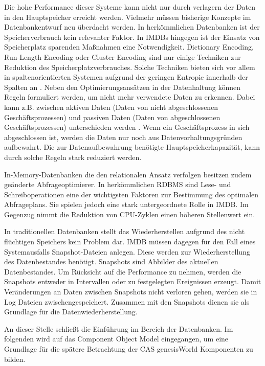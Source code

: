 Die hohe Performance dieser Systeme kann nicht nur durch verlagern der Daten in den Hauptspeicher erreicht werden. Vielmehr müssen bisherige Konzepte im Datenbankentwurf neu überdacht werden. In herkömmlichen Datenbanken ist der Speicherverbrauch kein relevanter Faktor. In IMDBs hingegen ist der Einsatz von Speicherplatz sparenden Maßnahmen eine Notwendigkeit. Dictionary Encoding, Run-Length Encoding oder Cluster Encoding sind nur einige Techniken zur Reduktion des Speicherplatzverbrauches. Solche Techniken bieten sich vor allem in spaltenorientierten Systemen aufgrund der geringen Entropie innerhalb der Spalten an \cite{Abadi:2006:ICE:1142473.1142548}. Neben den Optimierungsansätzen in der Datenhaltung können Regeln formuliert werden, um nicht mehr verwendete Daten zu erkennen. Dabei kann z.B. zwischen aktiven Daten (Daten von nicht abgeschlossenen Geschäftsprozessen) und passiven Daten (Daten von abgeschlossenen Geschäftsprozessen) unterschieden werden \cite{10.1109/ICDE.2013.6544811}. Wenn ein Geschäftsprozess in sich abgeschlossen ist, werden die Daten nur noch aus Datenvorhaltungsgründen aufbewahrt. Die zur Datenaufbewahrung benötigte Hauptspeicherkapazität, kann durch solche Regeln stark reduziert werden.
 
In-Memory-Datenbanken die den relationalen Ansatz verfolgen besitzen zudem geänderte Abfrageoptimierer. In herkömmlichen RDBMS sind Lese- und Schreiboperationen eine der wichtigsten Faktoren zur Bestimmung des optimalen Abfrageplans. Sie spielen jedoch eine stark untergeordnete Rolle in IMDB. Im Gegenzug nimmt die Reduktion von CPU-Zyklen einen höheren Stellenwert ein.

In traditionellen Datenbanken stellt das Wiederherstellen aufgrund des nicht flüchtigen Speichers kein Problem dar. IMDB müssen dagegen für den Fall eines Systemausfalls Snapshot-Dateien anlegen. Diese werden zur Wiederherstellung des Datenbestandes benötigt. Snapshots sind Abbilder des aktuellen Datenbestandes. Um Rücksicht auf die Performance zu nehmen, werden die Snapshots entweder in Intervallen oder zu festgelegten Ereignissen erzeugt. Damit Veränderungen an Daten zwischen Snapshots nicht verloren gehen, werden sie in Log Dateien zwischengespeichert. Zusammen mit den Snapshots dienen sie als Grundlage für die Datenwiederherstellung. 

An dieser Stelle schließt die Einführung im Bereich der Datenbanken. Im folgenden wird auf das Component Object Model eingegangen, um eine Grundlage für die spätere Betrachtung der CAS genesisWorld Komponenten zu bilden.

